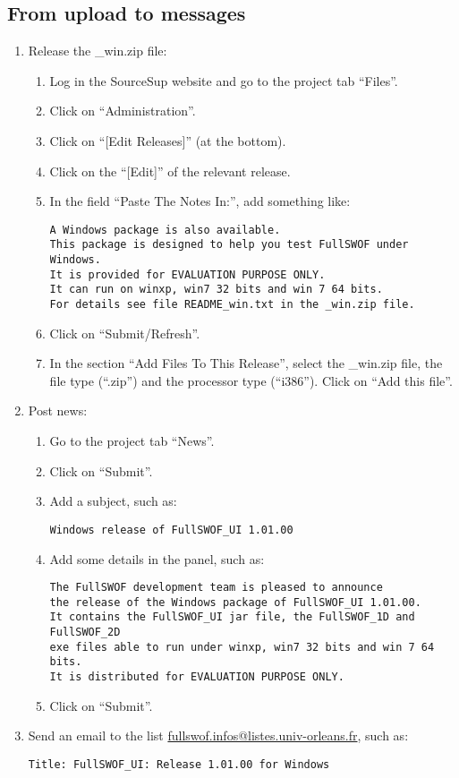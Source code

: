 \documentclass[a4paper, 11pt]{article}
\begin{document}
\subsection{From upload to messages}
\begin{enumerate}
\item Release the \_win.zip file:
\begin{enumerate}
\item Log in the SourceSup website and go to the project tab ``Files''.
\item Click on ``Administration''.
\item Click on ``[Edit Releases]'' (at the bottom).
\item Click on the ``[Edit]'' of the relevant release.
\item In the field ``Paste The Notes In:'', add something like:
\begin{verbatim}
A Windows package is also available.
This package is designed to help you test FullSWOF under Windows.
It is provided for EVALUATION PURPOSE ONLY.
It can run on winxp, win7 32 bits and win 7 64 bits.
For details see file README_win.txt in the _win.zip file.
\end{verbatim}
\item Click on ``Submit/Refresh''.
\item In the section ``Add Files To This Release'', select the \_win.zip file,
the file type (``.zip'') and the processor type  (``i386''). Click on ``Add this file''.
\end{enumerate}
\item Post news:
\begin{enumerate}
\item Go to the project tab ``News''.
\item Click on ``Submit''.
\item Add a subject, such as:
\begin{verbatim}
Windows release of FullSWOF_UI 1.01.00
\end{verbatim}
\item Add some details in the panel, such as:
\begin{verbatim}
The FullSWOF development team is pleased to announce
the release of the Windows package of FullSWOF_UI 1.01.00.
It contains the FullSWOF_UI jar file, the FullSWOF_1D and FullSWOF_2D 
exe files able to run under winxp, win7 32 bits and win 7 64 bits.
It is distributed for EVALUATION PURPOSE ONLY.
\end{verbatim}
\item Click on ``Submit''.
\end{enumerate}
\item Send an email to the list
\href{mailto:fullswof.infos@listes.univ-orleans.fr}{fullswof.infos@listes.univ-orleans.fr}, such as:
\begin{verbatim}
Title: FullSWOF_UI: Release 1.01.00 for Windows


\end{verbatim}
\end{enumerate}
\end{document}
